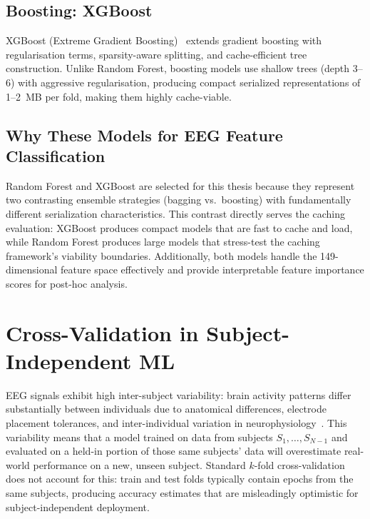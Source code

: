 \subsection{Boosting: XGBoost}

XGBoost (Extreme Gradient Boosting)~\cite{chen2016xgboost} extends
gradient boosting with
regularisation terms, sparsity-aware splitting, and cache-efficient tree
construction. Unlike Random Forest, boosting models use shallow trees
(depth 3--6) with aggressive regularisation, producing compact serialized
representations of 1--2~MB per fold, making them highly cache-viable.

\subsection{Why These Models for EEG Feature Classification}

Random Forest and XGBoost are selected for this thesis because they
represent two contrasting ensemble strategies (bagging vs.\ boosting)
with fundamentally different serialization characteristics. This contrast
directly serves the caching evaluation: XGBoost produces compact models
that are fast to cache and load, while Random Forest produces large models
that stress-test the caching framework's viability boundaries.
Additionally, both models handle the 149-dimensional feature space
effectively and provide interpretable feature importance scores for
post-hoc analysis.

\section{Cross-Validation in Subject-Independent ML}
\label{sec:loso_background}

EEG signals exhibit high inter-subject variability: brain activity patterns
differ substantially between individuals due to anatomical differences,
electrode placement tolerances, and inter-individual variation in
neurophysiology~\cite{huang2023intersubject}. This variability means that
a model trained on data from subjects $S_1, \ldots, S_{N-1}$ and evaluated
on a held-in portion of those same subjects' data will overestimate real-world
performance on a new, unseen subject. Standard $k$-fold cross-validation does
not account for this: train and test folds typically contain epochs from the
same subjects, producing accuracy estimates that are misleadingly optimistic
for subject-independent deployment.

